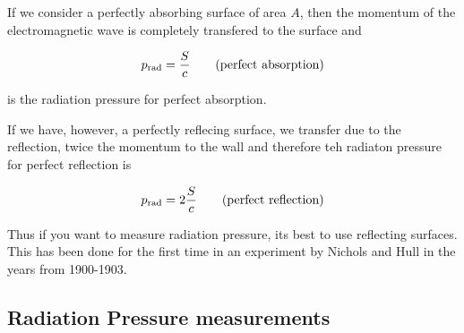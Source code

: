 \documentclass[
  a4paper,
]{book}
\begin{document}
If we consider a perfectly absorbing surface of area \(A\), then the
momentum of the electromagnetic wave is completely transfered to the
surface and

\[
p_{\rm rad}=\frac{S}{c}
\tag{perfect absorption}
\]

is the radiation pressure for perfect absorption.

If we have, however, a perfectly reflecing surface, we transfer due to
the reflection, twice the momentum to the wall and therefore teh
radiaton pressure for perfect reflection is

\[
p_{\rm rad}=2\frac{S}{c}
\tag{perfect reflection}
\]

Thus if you want to measure radiation pressure, its best to use
reflecting surfaces. This has been done for the first time in an
experiment by Nichols and Hull in the years from 1900-1903.

\subsection{Radiation Pressure
measurements}\label{radiation-pressure-measurements}
\end{document}
